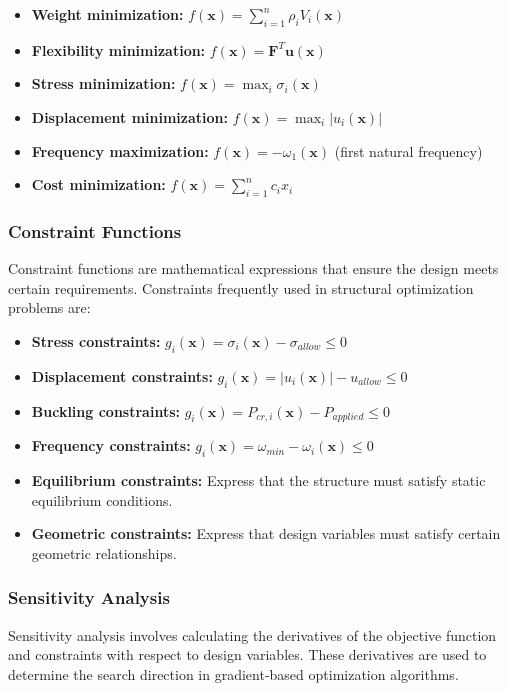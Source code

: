 \begin{itemize}
    \item \textbf{Weight minimization:} $f(\mathbf{x}) = \sum_{i=1}^{n} \rho_i V_i(\mathbf{x})$
    \item \textbf{Flexibility minimization:} $f(\mathbf{x}) = \mathbf{F}^T \mathbf{u}(\mathbf{x})$
    \item \textbf{Stress minimization:} $f(\mathbf{x}) = \max_{i} \sigma_i(\mathbf{x})$
    \item \textbf{Displacement minimization:} $f(\mathbf{x}) = \max_{i} |u_i(\mathbf{x})|$
    \item \textbf{Frequency maximization:} $f(\mathbf{x}) = -\omega_1(\mathbf{x})$ (first natural frequency)
    \item \textbf{Cost minimization:} $f(\mathbf{x}) = \sum_{i=1}^{n} c_i x_i$
\end{itemize}

\subsubsection{Constraint Functions}
Constraint functions are mathematical expressions that ensure the design meets certain requirements. Constraints frequently used in structural optimization problems are:

\begin{itemize}
    \item \textbf{Stress constraints:} $g_i(\mathbf{x}) = \sigma_i(\mathbf{x}) - \sigma_{allow} \leq 0$
    \item \textbf{Displacement constraints:} $g_i(\mathbf{x}) = |u_i(\mathbf{x})| - u_{allow} \leq 0$
    \item \textbf{Buckling constraints:} $g_i(\mathbf{x}) = P_{cr,i}(\mathbf{x}) - P_{applied} \leq 0$
    \item \textbf{Frequency constraints:} $g_i(\mathbf{x}) = \omega_{min} - \omega_i(\mathbf{x}) \leq 0$
    \item \textbf{Equilibrium constraints:} Express that the structure must satisfy static equilibrium conditions.
    \item \textbf{Geometric constraints:} Express that design variables must satisfy certain geometric relationships.
\end{itemize}

\subsubsection{Sensitivity Analysis}
Sensitivity analysis involves calculating the derivatives of the objective function and constraints with respect to design variables. These derivatives are used to determine the search direction in gradient-based optimization algorithms.

